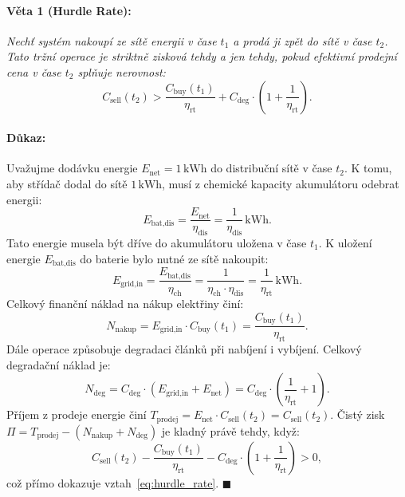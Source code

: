 \documentclass[FM,BP]{tulthesis}
\begin{document}
	\paragraph{Věta 1 (Hurdle Rate):}
	\textit{Nechť systém nakoupí ze sítě energii v čase $t_1$ a prodá ji zpět do sítě v čase $t_2$. Tato tržní operace je striktně zisková tehdy a jen tehdy, pokud efektivní prodejní cena v čase $t_2$ splňuje nerovnost:}
	\begin{equation}
		\label{eq:hurdle_rate}
		C_{\text{sell}}(t_2) > \frac{C_{\text{buy}}(t_1)}{\eta_{\text{rt}}} + C_{\text{deg}} \cdot \left( 1 + \frac{1}{\eta_{\text{rt}}} \right).
	\end{equation}

	\paragraph{Důkaz:}
	Uvažujme dodávku energie $E_{\text{net}} = 1\,\text{kWh}$ do distribuční sítě v čase $t_2$.
	K tomu, aby střídač dodal do sítě $1\,\text{kWh}$, musí z chemické kapacity akumulátoru odebrat energii:
	\begin{equation}
		E_{\text{bat,dis}} = \frac{E_{\text{net}}}{\eta_{\text{dis}}} = \frac{1}{\eta_{\text{dis}}}\,\text{kWh}.
	\end{equation}
	Tato energie musela být dříve do akumulátoru uložena v čase $t_1$. K uložení energie $E_{\text{bat,dis}}$ do baterie bylo nutné ze sítě nakoupit:
	\begin{equation}
		E_{\text{grid,in}} = \frac{E_{\text{bat,dis}}}{\eta_{\text{ch}}} = \frac{1}{\eta_{\text{ch}} \cdot \eta_{\text{dis}}} = \frac{1}{\eta_{\text{rt}}}\,\text{kWh}.
	\end{equation}
	Celkový finanční náklad na nákup elektřiny činí:
	\begin{equation}
		N_{\text{nakup}} = E_{\text{grid,in}} \cdot C_{\text{buy}}(t_1) = \frac{C_{\text{buy}}(t_1)}{\eta_{\text{rt}}}.
	\end{equation}
	Dále operace způsobuje degradaci článků při nabíjení i vybíjení. Celkový degradační náklad je:
	\begin{equation}
		N_{\text{deg}} = C_{\text{deg}} \cdot (E_{\text{grid,in}} + E_{\text{net}}) = C_{\text{deg}} \cdot \left( \frac{1}{\eta_{\text{rt}}} + 1 \right).
	\end{equation}
	Příjem z prodeje energie činí $T_{\text{prodej}} = E_{\text{net}} \cdot C_{\text{sell}}(t_2) = C_{\text{sell}}(t_2)$.
	Čistý zisk $\Pi = T_{\text{prodej}} - (N_{\text{nakup}} + N_{\text{deg}})$ je kladný právě tehdy, když:
	\begin{equation}
		C_{\text{sell}}(t_2) - \frac{C_{\text{buy}}(t_1)}{\eta_{\text{rt}}} - C_{\text{deg}} \cdot \left( 1 + \frac{1}{\eta_{\text{rt}}} \right) > 0,
	\end{equation}
	což přímo dokazuje vztah~\eqref{eq:hurdle_rate}. \hfill $\blacksquare$
\end{document}
